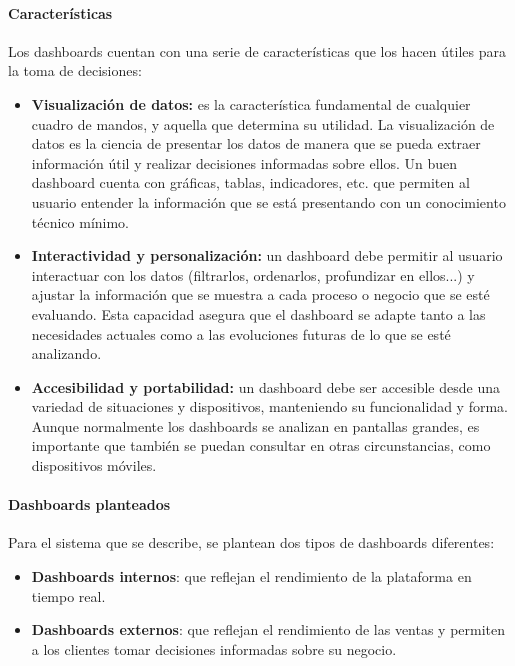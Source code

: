 \paragraph{Características}
Los dashboards cuentan con una serie de características que los hacen útiles para la toma de
decisiones:

\begin{itemize}
	\item \textbf{Visualización de datos:} es la característica fundamental de cualquier
		cuadro de mandos, y aquella que determina su utilidad. La visualización de datos
		es la ciencia de presentar los datos de manera que se pueda extraer información útil
		y realizar decisiones informadas sobre ellos. Un buen dashboard cuenta con gráficas,
		tablas, indicadores, etc. que permiten al usuario entender la información que se
		está presentando con un conocimiento técnico mínimo.
	\item \textbf{Interactividad y personalización:} un dashboard debe permitir al usuario
		interactuar con los datos (filtrarlos, ordenarlos, profundizar en ellos...) y ajustar
		la información que se muestra a cada proceso o negocio que se esté evaluando.
		Esta capacidad asegura que el dashboard se adapte tanto a las necesidades actuales
		como a las evoluciones futuras de lo que se esté analizando.
	\item \textbf{Accesibilidad y portabilidad:} un dashboard debe ser accesible desde una
		variedad de situaciones y dispositivos, manteniendo su funcionalidad y forma. Aunque
		normalmente los dashboards se analizan en pantallas grandes, es importante que también
		se puedan consultar en otras circunstancias, como dispositivos móviles.
\end{itemize}

\newpage{}
\paragraph{Dashboards planteados}
Para el sistema que se describe, se plantean dos tipos de dashboards diferentes:
\begin{itemize}
	\item \textbf{Dashboards internos}: que reflejan el rendimiento de la plataforma en tiempo real.
	\item \textbf{Dashboards externos}: que reflejan el rendimiento de las ventas y permiten a los
	      clientes tomar decisiones informadas sobre su negocio.
\end{itemize}


